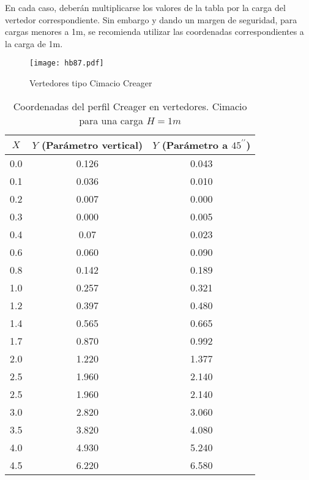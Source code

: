 En cada caso, deberán multiplicarse los valores de la tabla por la carga del vertedor correspondiente. Sin embargo y dando un margen de seguridad, para cargas menores a 1m, se recomienda utilizar las coordenadas correspondientes a la carga de 1m.

\begin{figure}[h!]
\centering
  \texttt{[image: hb87.pdf]}
  \caption{Vertedores tipo Cimacio Creager}
  \label{hb87}
\end{figure}
\begin{table}[h!]
    \centering\begin{tabular}{@{}ccc@{}}
    \toprule
    $X$ & $Y$ (Parámetro vertical) & $Y$ (Parámetro a $45^{\prime\prime}$) \\ \midrule
    0.0 & 0.126                    & 0.043                                 \\
    0.1 & 0.036                    & 0.010                                 \\
    0.2 & 0.007                    & 0.000                                 \\
    0.3 & 0.000                    & 0.005                                 \\
    0.4 & 0.07                     & 0.023                                 \\
    0.6 & 0.060                    & 0.090                                 \\
    0.8 & 0.142                    & 0.189                                 \\
    1.0 & 0.257                    & 0.321                                 \\
    1.2 & 0.397                    & 0.480                                 \\
    1.4 & 0.565                    & 0.665                                 \\
    1.7 & 0.870                    & 0.992                                 \\
    2.0 & 1.220                    & 1.377                                 \\
    2.5 & 1.960                    & 2.140                                 \\
    2.5 & 1.960                    & 2.140                                 \\
    3.0 & 2.820                    & 3.060                                 \\
    3.5 & 3.820                    & 4.080                                 \\
    4.0 & 4.930                    & 5.240                                 \\
    4.5 & 6.220                    & 6.580                                 \\ \bottomrule
    \end{tabular}
    \caption{Coordenadas del perfil Creager en vertedores. Cimacio para una carga $H=1m$}
    \label{tabhb8}
    \end{table}

